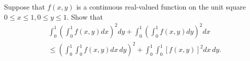 Suppose that $f(x,y)$ is a continuous real-valued function on the unit
square $0 \le x \le 1, 0 \le y \le 1$.  Show that
\begin{align*}
& \int_0^1 \left( \int_0^1  f(x,y) dx \right)^2 dy +
 \int_0^1 \left( \int_0^1  f(x,y) dy \right)^2 dx \\
&\leq
\left( \int_0^1 \int_0^1  f(x,y) dx\, dy \right)^2 +
\int_0^1 \int_0^1 \left[ f(x,y) \right]^2 dx\,dy.
\end{align*}
